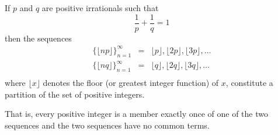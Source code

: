 \documentclass[12pt]{article}
\begin{document}
If $p$ and $q$ are positive irrationals such that
$$\frac{1}{p}+\frac{1}{q}=1$$
then the sequences
\begin{eqnarray*}
\{\lfloor np\rfloor\}_{n=1}^\infty&=&\lfloor p\rfloor,\lfloor 2p\rfloor,\lfloor 3p\rfloor,\ldots\\
\{\lfloor nq\rfloor\}_{n=1}^\infty&=&\lfloor q\rfloor,\lfloor 2q\rfloor,\lfloor 3q\rfloor,\ldots\\
\end{eqnarray*}
where $\lfloor x\rfloor$ denotes the floor (or greatest integer function) of $x$, constitute a partition of the set of positive integers.

That is, every positive integer is a member exactly once of one of the two sequences and the two sequences have no common terms.
\end{document}
